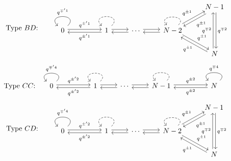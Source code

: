 \documentclass{amsart}
\begin{document}
\begin{equation}
\label{eqn:dynkin bd}
\text{Type $BD$:} \quad \begin{tikzcd}
&&&&& N-1 \\
0 && 1 & \cdots & {N-2} \\
&&&&& N
\arrow[shift left=2pt, from=2-5, to=2-4]
\arrow[shift left=2pt, from=2-4, to=2-5]
\arrow[shift left=2pt, from=2-4, to=2-3]
\arrow[shift left=2pt, from=2-3, to=2-4]
\arrow["q^{\pm' 1}", shift left=2pt, from=2-3, to=2-1]
\arrow["q^{\pm' 1}", shift left=2pt, from=2-1, to=2-3]
\arrow["q^{\pm 1}", shift left=2pt, from=1-6, to=2-5]
\arrow["q^{\pm 1}", shift left=2pt, from=2-5, to=1-6]
\arrow["q^{\pm 1}", shift left=2pt, from=3-6, to=2-5]
\arrow["q^{\pm 1}", shift left=2pt, from=2-5, to=3-6]
\arrow["q^{\mp 2}", shift left=2pt, from=3-6, to=1-6]
\arrow["q^{\mp 2}", shift left=2pt, from=1-6, to=3-6]
\arrow["q^{\mp' 1}"', from=2-1, to=2-1, looseness=4.5]
\arrow[dashed, from=2-3, to=2-3, looseness=4.5]
\arrow[dashed, from=2-5, to=2-5, looseness=3.3]
\end{tikzcd}
\end{equation}
\begin{equation}
\label{eqn:dynkin cc}
\text{Type $CC$:} \begin{tikzcd}
0 && 1 & \cdots & {N-1} && N
\arrow["q^{\pm 2}", shift left=2pt, from=1-7, to=1-5]
\arrow["q^{\pm 2}", shift left=2pt, from=1-5, to=1-7]
\arrow[shift left=2pt, from=1-5, to=1-4]
\arrow[shift left=2pt, from=1-4, to=1-5]
\arrow[shift left=2pt, from=1-4, to=1-3]
\arrow[shift left=2pt, from=1-3, to=1-4]
\arrow["q^{\pm' 2}", shift left=2pt, from=1-3, to=1-1]
\arrow["q^{\pm' 2}", shift left=2pt, from=1-1, to=1-3]
\arrow["q^{\mp 4}"', from=1-7, to=1-7, looseness=3.3]
\arrow[dashed, from=1-5, to=1-5, looseness=3.3]
\arrow[dashed, from=1-3, to=1-3, looseness=4]
\arrow["q^{\mp' 4}"', from=1-1, to=1-1, looseness=4]
\end{tikzcd}
\end{equation}
\begin{equation}
\label{eqn:dynkin cd}
\text{Type $CD$:} \quad \begin{tikzcd}
&&&&& N-1 \\
0 && 1 & \cdots & {N-2} \\
&&&&& N
\arrow[shift left=2pt, from=2-5, to=2-4]
\arrow[shift left=2pt, from=2-4, to=2-5]
\arrow[shift left=2pt, from=2-4, to=2-3]
\arrow[shift left=2pt, from=2-3, to=2-4]
\arrow["q^{\pm' 2}", shift left=2pt, from=2-3, to=2-1]
\arrow["q^{\pm' 2}", shift left=2pt, from=2-1, to=2-3]
\arrow["q^{\pm 1}", shift left=2pt, from=1-6, to=2-5]
\arrow["q^{\pm 1}", shift left=2pt, from=2-5, to=1-6]
\arrow["q^{\pm 1}", shift left=2pt, from=3-6, to=2-5]
\arrow["q^{\pm 1}", shift left=2pt, from=2-5, to=3-6]
\arrow["q^{\mp 2}", shift left=2pt, from=3-6, to=1-6]
\arrow["q^{\mp 2}", shift left=2pt, from=1-6, to=3-6]
\arrow["q^{\mp' 4}"', from=2-1, to=2-1, looseness=4.5]
\arrow[dashed, from=2-3, to=2-3, looseness=4.5]
\arrow[dashed, from=2-5, to=2-5, looseness=3.3]
\end{tikzcd}
\end{equation}
\end{document}

